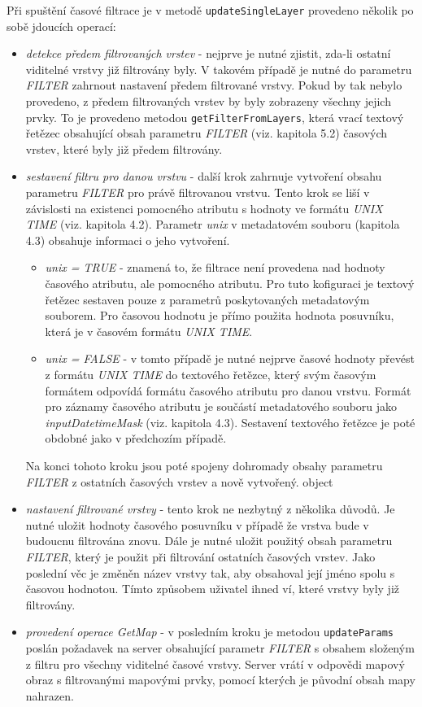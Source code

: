 Při spuštění časové filtrace je v metodě \verb|updateSingleLayer|
provedeno několik po sobě jdoucích operací:
\begin{itemize}
	\item\textit{detekce předem filtrovaných vrstev} - nejprve je
	nutné zjistit, zda-li ostatní viditelné vrstvy již filtrovány
	byly. V takovém případě je nutné do parametru \textit{FILTER}
	zahrnout nastavení předem filtrované vrstvy. Pokud by tak
	nebylo provedeno, z předem filtrovaných vrstev by byly
	zobrazeny všechny jejich prvky. To je provedeno
	metodou \verb|getFilterFromLayers|, která vrací textový
	řetězec obsahující obsah parametru \textit{FILTER}
	(viz. kapitola 5.2) časových vrstev, které byly již předem
	filtrovány.
        \item\textit{sestavení filtru pro danou vrstvu} -
	další krok zahrnuje vytvoření obsahu parametru \textit{FILTER}
	pro právě filtrovanou vrstvu. Tento krok se liší v závislosti
	na existenci pomocného atributu s hodnoty ve
	formátu \textit{UNIX TIME} (viz. kapitola
	4.2). Parametr \textit{unix} v metadatovém souboru (kapitola
	4.3) obsahuje informaci o jeho
	vytvoření.  \begin{itemize} \item\textit{unix = TRUE} -
	znamená to, že filtrace není provedena nad hodnoty časového
	atributu, ale pomocného atributu. Pro tuto kofiguraci je
	textový řetězec sestaven pouze z parametrů poskytovaných
	metadatovým souborem. Pro časovou hodnotu je přímo použita
	hodnota posuvníku, která je v časovém formátu \textit{UNIX
	TIME}.
        \item\textit{unix = FALSE} - v tomto případě je nutné
	nejprve časové hodnoty převést z formátu \textit{UNIX TIME} do
	textového řetězce, který svým časovým formátem odpovídá
	formátu časového atributu pro danou vrstvu. Formát pro záznamy
	časového atributu je součástí metadatového souboru
	jako \textit{inputDatetimeMask} (viz. kapitola 4.3). Sestavení
	textového řetězce je poté obdobné jako v předchozím
	případě.  \end{itemize} Na konci tohoto kroku jsou poté
	spojeny dohromady obsahy parametru \textit{FILTER} z ostatních
	časových vrstev a nově vytvořený.  %
	object
        \item\textit{nastavení filtrované vrstvy} - tento krok
	ne nezbytný z několika důvodů. Je nutné uložit hodnoty
	časového posuvníku v případě že vrstva bude v budoucnu
	filtrována znovu. Dále je nutné uložit použitý obsah
	parametru \textit{FILTER}, který je použit při filtrování
	ostatních časových vrstev. Jako poslední věc je změněn název
	vrstvy tak, aby obsahoval její jméno spolu s časovou
	hodnotou. Tímto způsobem uživatel ihned ví, které vrstvy byly
	již filtrovány.
        \item\textit{provedení operace GetMap} - v
	posledním kroku je metodou \verb|updateParams| poslán
	požadavek na server obsahující parametr \textit{FILTER} s
	obsahem složeným z filtru pro všechny viditelné časové
	vrstvy. Server vrátí v odpovědi mapový obraz s filtrovanými
	mapovými prvky, pomocí kterých je původní obsah mapy nahrazen.
\end{itemize}

